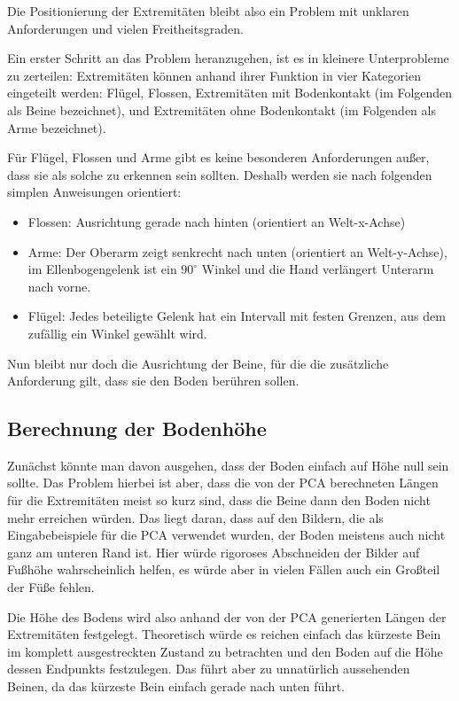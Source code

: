 Die Positionierung der Extremitäten bleibt also ein Problem mit unklaren Anforderungen und vielen Freitheitsgraden.

Ein erster Schritt an das Problem heranzugehen, ist es in kleinere Unterprobleme zu zerteilen:
Extremitäten können anhand ihrer Funktion in vier Kategorien eingeteilt werden:
Flügel, Flossen, Extremitäten mit Bodenkontakt (im Folgenden als Beine bezeichnet), und Extremitäten ohne Bodenkontakt (im Folgenden als Arme bezeichnet).

Für Flügel, Flossen und Arme gibt es keine besonderen Anforderungen außer, dass sie als solche zu erkennen sein sollten. Deshalb werden sie nach folgenden simplen Anweisungen orientiert:
\begin{itemize}
 \item Flossen: Ausrichtung gerade nach hinten (orientiert an Welt-x-Achse)
 \item Arme: Der Oberarm zeigt senkrecht nach unten (orientiert an Welt-y-Achse), im Ellenbogengelenk ist ein $90^{\circ}$ Winkel und die Hand verlängert Unterarm nach vorne.
 \item Flügel: Jedes beteiligte Gelenk hat ein Intervall mit festen Grenzen, aus dem zufällig ein Winkel gewählt wird.
\end{itemize}

Nun bleibt nur doch die Ausrichtung der Beine, für die die zusätzliche Anforderung gilt, dass sie den Boden berühren sollen.


\subsection{Berechnung der Bodenhöhe}

Zunächst könnte man davon ausgehen, dass der Boden einfach auf Höhe null sein sollte. Das Problem hierbei ist aber, dass die von der PCA berechneten Längen für die Extremitäten meist so kurz sind, dass die Beine dann den Boden nicht mehr erreichen würden. Das liegt daran, dass auf den Bildern, die als Eingabebeispiele für die PCA verwendet wurden, der Boden meistens auch nicht ganz am unteren Rand ist. Hier würde rigoroses Abschneiden der Bilder auf Fußhöhe wahrscheinlich helfen, es würde aber in vielen Fällen auch ein Großteil der Füße fehlen.

Die Höhe des Bodens wird also anhand der von der PCA generierten Längen der Extremitäten festgelegt.
Theoretisch würde es reichen einfach das kürzeste Bein im komplett ausgestreckten Zustand zu betrachten und den Boden auf die Höhe dessen Endpunkts festzulegen.
Das führt aber zu unnatürlich aussehenden Beinen, da das kürzeste Bein einfach gerade nach unten führt.

